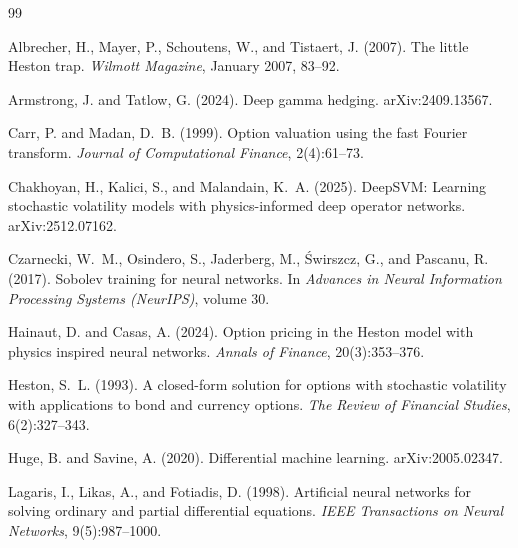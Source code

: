 \documentclass[10pt]{article}
\begin{document}
\begin{thebibliography}{99}

Albrecher, H., Mayer, P., Schoutens, W., and Tistaert, J. (2007).
\newblock The little Heston trap.
\newblock \emph{Wilmott Magazine}, January 2007, 83--92.

Armstrong, J. and Tatlow, G. (2024).
\newblock Deep gamma hedging.
\newblock arXiv:2409.13567.

Carr, P. and Madan, D.~B. (1999).
\newblock Option valuation using the fast Fourier transform.
\newblock \emph{Journal of Computational Finance}, 2(4):61--73.

Chakhoyan, H., Kalici, S., and Malandain, K.~A. (2025).
\newblock DeepSVM: Learning stochastic volatility models with physics-informed
deep operator networks.
\newblock arXiv:2512.07162.

Czarnecki, W.~M., Osindero, S., Jaderberg, M., \'Swirszcz, G., and Pascanu, R. (2017).
\newblock Sobolev training for neural networks.
\newblock In \emph{Advances in Neural Information Processing Systems (NeurIPS)}, volume 30.

Hainaut, D. and Casas, A. (2024).
\newblock Option pricing in the Heston model with physics inspired neural networks.
\newblock \emph{Annals of Finance}, 20(3):353--376.

Heston, S.~L. (1993).
\newblock A closed-form solution for options with stochastic volatility with
applications to bond and currency options.
\newblock \emph{The Review of Financial Studies}, 6(2):327--343.

Huge, B. and Savine, A. (2020).
\newblock Differential machine learning.
\newblock arXiv:2005.02347.

Lagaris, I., Likas, A., and Fotiadis, D. (1998).
\newblock Artificial neural networks for solving ordinary and partial
differential equations.
\newblock \emph{IEEE Transactions on Neural Networks}, 9(5):987--1000.


\end{thebibliography}
\end{document}
